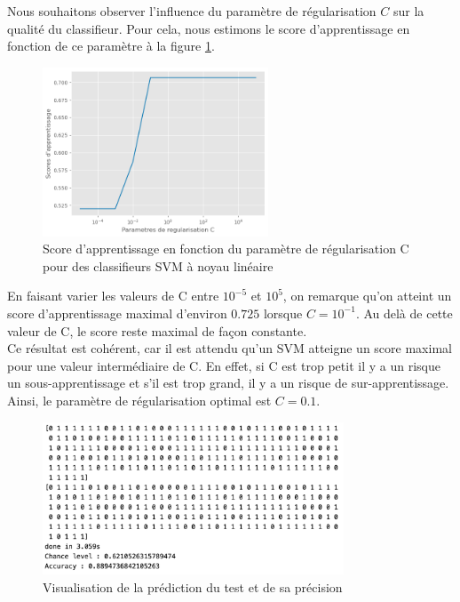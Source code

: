 \documentclass[a4paper,12pt]{article}
\begin{document}
Nous souhaitons observer l'influence du paramètre de régularisation $C$ sur la qualité du classifieur. 
Pour cela, nous estimons le score d'apprentissage en fonction de ce paramètre à la figure \ref{fig : C}.

\begin{figure}[H]
    \centering
    \includegraphics[width=0.6\textwidth]{Images/erreur_prediction.png}
    \caption{Score d'apprentissage en fonction du paramètre de régularisation C pour des classifieurs SVM à noyau linéaire}\label{fig : C}
\end{figure}

En faisant varier les valeurs de C entre $10^{-5}$ et $10^{5}$, on remarque qu'on atteint un score d'apprentissage maximal d'environ $0.725$ lorsque $C=10^{-1}$.
Au delà de cette valeur de C, le score reste maximal de façon constante.\\
Ce résultat est cohérent, car il est attendu qu’un SVM atteigne un score maximal pour une valeur intermédiaire de 
C. En effet, si C est trop petit il y a un risque un sous-apprentissage et s'il est trop grand, il y a un risque de sur-apprentissage.\\
Ainsi, le paramètre de régularisation optimal est $C=0.1$.\\[0.5cm]


\begin{figure}[H]    
    \centering    
    \includegraphics[width=0.8\textwidth]{Images/label_prediction.png}
    \caption{Visualisation de la prédiction du test et de sa précision}\label{fig : precision}
\end{figure}
\end{document}
